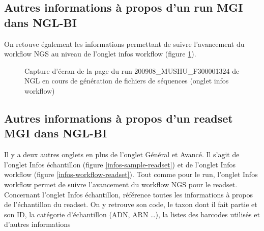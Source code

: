 \subsection*{Autres informations à propos d'un run MGI dans NGL-BI}

On retouve également les informations permettant de suivre l'avancement du workflow NGS au niveau de l'onglet \og infos workflow\fg{} (figure \ref{infos-workflow-run}).

\begin{figure}[H]
    \centering
    \caption{\footnotesize{Capture d'écran de la page du run 200908\_MUSHU\_F300001324 de NGL en cours de génération de fichiers de séquences (onglet \og infos workflow\fg{})}}
    \label{infos-workflow-run}
\end{figure}

\subsection*{Autres informations à propos d'un readset MGI dans NGL-BI}

Il y a deux autres onglets en plus de l'onglet \og Général\fg{} et \og Avancé\fg{}. Il s'agit de l'onglet \og Infos échantillon\fg{} (figure \ref{infos-sample-readset}) et de l'onglet \og Infos workflow\fg{} (figure \ref{infos-workflow-readset}). Tout comme pour le run, l'onglet \og Infos workflow\fg{} permet de suivre l'avancement du workflow NGS pour le readset. Concernant l'onglet \og Infos échantillon\fg{}, référence toutes les informations à propos de l'échantillon du readset. On y retrouve son code, le taxon dont il fait partie et son ID, la catégorie d'échantillon (ADN, ARN \dots), la listes des barcodes utilisés et d'autres informations

